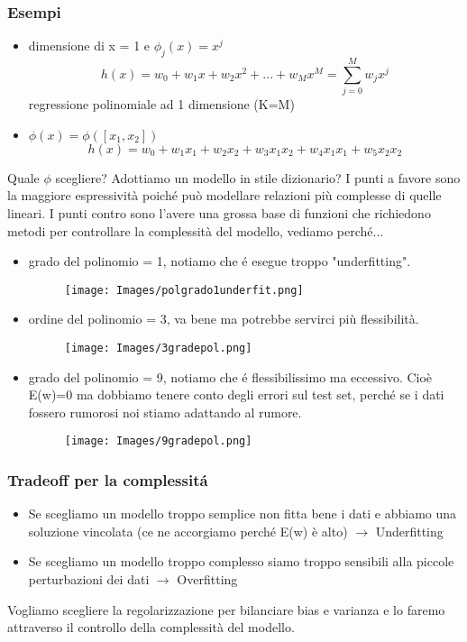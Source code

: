 \documentclass{article}
\begin{document}
\subsubsection{Esempi}
\begin{itemize}
    \item dimensione di x = 1 e $\phi_j(x)=x^j$ 
    \begin{equation}
    h(x) = w_0+w_1x+w_2x^2+...+w_Mx^M=\sum_{j = 0}^M w_jx^j
    \end{equation}
    regressione polinomiale ad 1 dimensione (K=M)
    \item $\phi(x)=\phi([x_1,x_2])$
    \begin{equation}
    h(x) = w_0+w_1x_1+w_2x_2+w_3x_1x_2+w_4x_1x_1+w_5x_2x_2
    \end{equation}
\end{itemize}
Quale $\phi$ scegliere? Adottiamo un modello in stile dizionario? I punti a favore sono la maggiore espressività poiché può modellare relazioni più complesse di quelle lineari. I punti contro sono l'avere una grossa base di funzioni che richiedono metodi per controllare la complessità del modello, vediamo perché...
\begin{itemize}
    \item grado del polinomio = 1, notiamo che é esegue troppo "underfitting".
    \begin{figure}[H]
    \centering
    \texttt{[image: Images/polgrado1underfit.png]}
    \end{figure}
    \clearpage
    
    \item ordine del polinomio = 3, va bene ma potrebbe servirci più flessibilità.
    \begin{figure}[H]
    \centering
    \texttt{[image: Images/3gradepol.png]}
    \end{figure}
    
    \item grado del polinomio = 9, notiamo che é flessibilissimo ma eccessivo. Cioè E(w)=0 ma dobbiamo tenere conto degli errori sul test set, perché se i dati fossero rumorosi noi stiamo adattando al rumore.
    \begin{figure}[H]
    \centering
    \texttt{[image: Images/9gradepol.png]}
    \end{figure}
\end{itemize}

\subsubsection{Tradeoff per la complessitá}
\begin{itemize}
    \item Se scegliamo un modello troppo semplice non fitta bene i dati e abbiamo una soluzione vincolata (ce ne accorgiamo perché E(w) è alto) $\rightarrow$ Underfitting
    \item Se scegliamo un modello troppo complesso siamo troppo sensibili alla piccole perturbazioni dei dati $\rightarrow$ Overfitting
\end{itemize}
Vogliamo scegliere la regolarizzazione per bilanciare bias e varianza e lo faremo attraverso il controllo della complessità del modello.
\clearpage
\end{document}
